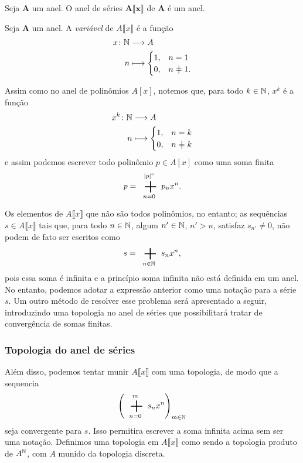 \begin{exercise}
Seja $\bm A$ um anel. O anel de séries $\bm{A\llbracket x \rrbracket}$ de $\bm A$ é um anel.
\end{exercise}

\begin{definition}
Seja $\bm A$ um anel. A \emph{variável} de $A\llbracket x \rrbracket$ é a função
	\begin{align*}
	\func{x}{\N}{A}{n}{\begin{cases}
		1,& n=1 \\
		0,& n\neq 1.
	\end{cases}}
	\end{align*}
\end{definition}

Assim como no anel de polinômios $A[x]$, notemos que, para todo $k \in \mathbb{N}$, $x^k$ é a função
	\begin{align*}
	\func{x^k}{\N}{A}{n}{\begin{cases}
		1,& n=k \\
		0,& n \neq k
	\end{cases}}
	\end{align*}
e assim podemos escrever todo polinômio $p \in A[x]$ como uma soma finita
	\begin{equation*}
	p = \sum_{n=0}^{\grau{p}} p_nx^n.
	\end{equation*}

Os elementos de $A\llbracket x \rrbracket$ que não são todos polinômios, no entanto; as sequências $s \in A\llbracket x \rrbracket$ tais que, para todo $n \in \mathbb{N}$, algum $n' \in \mathbb{N}$, $n' > n$, satisfaz $s_{n'} \neq 0$, não podem de fato ser escritos como
	\begin{equation*}
	s = \sum_{n \in \N} s_nx^n,
	\end{equation*}
pois essa soma é infinita e a princípio soma infinita não está definida em um anel. No entanto, podemos adotar a expressão anterior como uma notação para a série $s$. Um outro método de resolver esse problema será apresentado a seguir, introduzindo uma topologia no anel de séries que possibilitará tratar de convergência de somas finitas.

\subsubsection{Topologia do anel de séries}

Além disso, podemos tentar munir $A\llbracket x \rrbracket$ com uma topologia, de modo que a sequencia
	\begin{equation*}
	\left( \sum_{n = 0}^{m} s_nx^n \right)_{m \in \N}
	\end{equation*}
seja convergente para $s$. Isso permitira escrever a soma infinita acima sem ser uma notação. Definimos uma topologia em $A\llbracket x \rrbracket$ como sendo a topologia produto de $A^{\mathbb{N}}$, com $A$ munido da topologia discreta.

